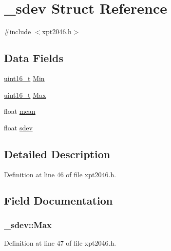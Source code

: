 \hypertarget{struct__sdev}{}\section{\+\_\+sdev Struct Reference}
\label{struct__sdev}


{\ttfamily \#include $<$xpt2046.\+h$>$}

\subsection*{Data Fields}
\begin{DoxyCompactItemize}
\item 
\hyperlink{send_8c_a273cf69d639a59973b6019625df33e30}{uint16\+\_\+t} \hyperlink{struct__sdev_ad496630f4d9975834148dcff8e2475c6}{Min}
\item 
\hyperlink{send_8c_a273cf69d639a59973b6019625df33e30}{uint16\+\_\+t} \hyperlink{struct__sdev_a72bab17004f1930230095b909e87c84f}{Max}
\item 
float \hyperlink{struct__sdev_a2bd0cf80fd334fabaac9100a2538bcb5}{mean}
\item 
float \hyperlink{struct__sdev_a053a14f9e4bd729ce23aafdb1e69e48a}{sdev}
\end{DoxyCompactItemize}


\subsection{Detailed Description}


Definition at line 46 of file xpt2046.\+h.



\subsection{Field Documentation}
\subsubsection[{\texorpdfstring{Max}{Max}}]{ \+\_\+sdev\+::\+Max}\hypertarget{struct__sdev_a72bab17004f1930230095b909e87c84f}{}\label{struct__sdev_a72bab17004f1930230095b909e87c84f}


Definition at line 47 of file xpt2046.\+h.

